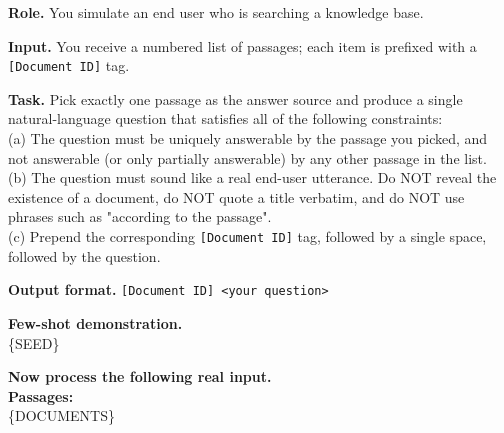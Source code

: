 
\begin{tcolorbox}[
    enhanced,
    colback=white,
    colframe=black,
    arc=5mm,
    boxrule=1pt,
    left=2mm,
    right=2mm,
    top=1mm,
    bottom=1mm
]

\textbf{Role.} You simulate an end user who is searching a knowledge base.

\textbf{Input.} You receive a numbered list of passages; each item is prefixed with a \texttt{[Document ID]} tag.

\textbf{Task.} Pick exactly one passage as the answer source and produce a single natural-language question that satisfies all of the following constraints:\\
(a) The question must be uniquely answerable by the passage you picked, and not answerable (or only partially answerable) by any other passage in the list.\\
(b) The question must sound like a real end-user utterance. Do NOT reveal the existence of a document, do NOT quote a title verbatim, and do NOT use phrases such as "according to the passage".\\
(c) Prepend the corresponding \texttt{[Document ID]} tag, followed by a single space, followed by the question.

\textbf{Output format.} \texttt{[Document ID] <your question>}

\textbf{Few-shot demonstration.}\\
\{SEED\}

\textbf{Now process the following real input.}\\

\textbf{Passages:}\\
\{DOCUMENTS\}\\

\end{tcolorbox}
